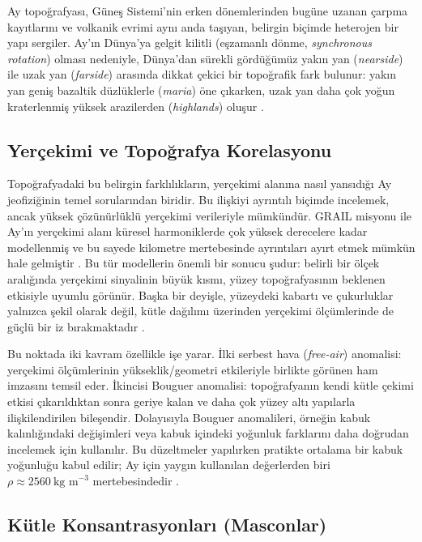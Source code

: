 Ay topoğrafyası, Güneş Sistemi'nin erken dönemlerinden bugüne uzanan çarpma kayıtlarını ve volkanik evrimi aynı anda
taşıyan, belirgin biçimde heterojen bir yapı sergiler. Ay'ın Dünya'ya gelgit kilitli (eşzamanlı dönme,
\textit{synchronous rotation}) olması nedeniyle, Dünya'dan sürekli gördüğümüz yakın yan (\textit{nearside}) ile
uzak yan (\textit{farside}) arasında dikkat çekici bir topoğrafik fark bulunur: yakın yan geniş bazaltik düzlüklerle
(\textit{maria}) öne çıkarken, uzak yan daha çok yoğun kraterlenmiş yüksek arazilerden (\textit{highlands}) oluşur
\cite{Zuber2013}.

\subsection{Yerçekimi ve Topoğrafya Korelasyonu}

Topoğrafyadaki bu belirgin farklılıkların, yerçekimi alanına nasıl yansıdığı Ay jeofiziğinin temel sorularından biridir.
Bu ilişkiyi ayrıntılı biçimde incelemek, ancak yüksek çözünürlüklü yerçekimi verileriyle mümkündür. GRAIL misyonu ile
Ay'ın yerçekimi alanı küresel harmoniklerde çok yüksek derecelere kadar modellenmiş ve bu sayede kilometre mertebesinde
ayrıntıları ayırt etmek mümkün hale gelmiştir \cite{Zuber2013}. Bu tür modellerin önemli bir sonucu şudur:
belirli bir ölçek aralığında yerçekimi sinyalinin büyük kısmı, yüzey topoğrafyasının beklenen etkisiyle uyumlu görünür.
Başka bir deyişle, yüzeydeki kabartı ve çukurluklar yalnızca şekil olarak değil, kütle dağılımı üzerinden yerçekimi
ölçümlerinde de güçlü bir iz bırakmaktadır \cite{Zuber2013}.

Bu noktada iki kavram özellikle işe yarar. İlki serbest hava (\textit{free-air}) anomalisi: yerçekimi ölçümlerinin
yükseklik/geometri etkileriyle birlikte görünen ham imzasını temsil eder. İkincisi Bouguer anomalisi: topoğrafyanın
kendi kütle çekimi etkisi çıkarıldıktan sonra geriye kalan ve daha çok yüzey altı yapılarla ilişkilendirilen bileşendir.
Dolayısıyla Bouguer anomalileri, örneğin kabuk kalınlığındaki değişimleri veya kabuk içindeki yoğunluk farklarını
daha doğrudan incelemek için kullanılır. Bu düzeltmeler yapılırken pratikte ortalama bir kabuk yoğunluğu kabul edilir;
Ay için yaygın kullanılan değerlerden biri $\rho \approx 2560~\text{kg m}^{-3}$ mertebesindedir \cite{Zuber2013}.


\subsection{Kütle Konsantrasyonları (Masconlar)}

